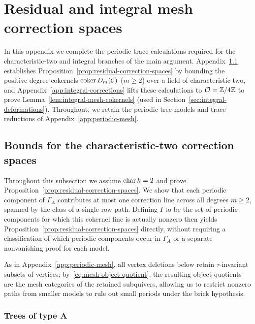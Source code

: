 \section{Residual and integral mesh correction spaces}
\label{app:residual-mesh}

In this appendix we complete the periodic trace calculations required for the characteristic-two and integral branches of the main argument. Appendix~\ref{app:characteristic-two-calculations} establishes Proposition~\ref{prop:residual-correction-spaces} by bounding the positive-degree cokernels $\operatorname{coker}D_m(\mathcal C)$ ($m\geq2$) over a field of characteristic two, and Appendix~\ref{app:integral-corrections} lifts these calculations to $\mathcal O=\mathbb Z/4\mathbb Z$ to prove Lemma~\ref{lem:integral-mesh-cokernels} (used in Section~\ref{sec:integral-deformations}). Throughout, we retain the periodic tree models and trace reductions of Appendix~\ref{app:periodic-mesh}.

\subsection{Bounds for the characteristic-two correction spaces}
\label{app:characteristic-two-calculations}

Throughout this subsection we assume $\operatorname{char} k=2$ and prove Proposition~\ref{prop:residual-correction-spaces}. We show that each periodic component of $\Gamma_A$ contributes at most one correction line across all degrees $m\geq2$, spanned by the class of a single row path. Defining $I$ to be the set of periodic components for which this cokernel line is actually nonzero then yields Proposition~\ref{prop:residual-correction-spaces} directly, without requiring a classification of which periodic components occur in $\Gamma_A$ or a separate nonvanishing proof for each model.

As in Appendix~\ref{app:periodic-mesh}, all vertex deletions below retain $\tau$-invariant subsets of vertices; by~\eqref{eq:mesh-object-quotient}, the resulting object quotients are the mesh categories of the retained subquivers, allowing us to restrict nonzero paths from smaller models to rule out small periods under the brick hypothesis.

\subsubsection{Trees of type A}
\label{app:char2-line-models}

